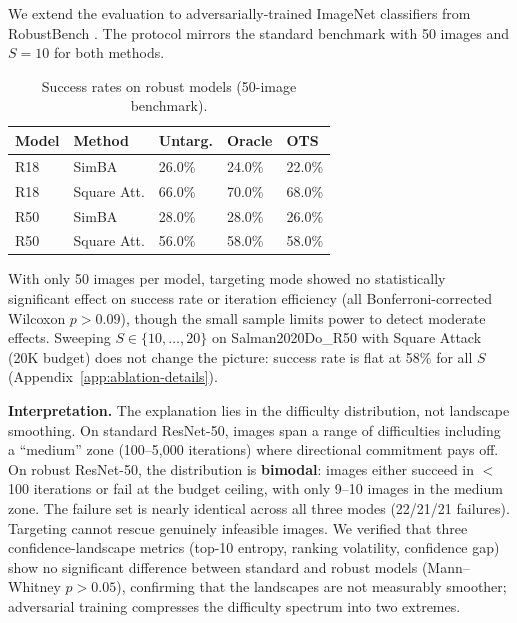 \documentclass{cap2026}
\begin{document}
We extend the evaluation to adversarially-trained ImageNet classifiers from RobustBench \citep{salman2020adversarially,croce2021robustbench}. The protocol mirrors the standard benchmark with 50 images and $S=10$ for both methods.

\begin{table}[t]
\centering
\caption{Success rates on robust models (50-image benchmark).}
\label{tab:robust-results}
\small
\begin{tabular}{@{}lllll@{}}
\toprule
Model & Method & Untarg. & Oracle & OTS \\
\midrule
R18 & SimBA & 26.0\% & 24.0\% & 22.0\% \\
R18 & Square Att. & 66.0\% & 70.0\% & 68.0\% \\
R50 & SimBA & 28.0\% & 28.0\% & 26.0\% \\
R50 & Square Att. & 56.0\% & 58.0\% & 58.0\% \\
\bottomrule
\end{tabular}
\end{table}

With only 50 images per model, targeting mode showed no statistically significant effect on success rate or iteration efficiency (all Bonferroni-corrected Wilcoxon $p > 0.09$), though the small sample limits power to detect moderate effects. Sweeping $S \in \{10, \ldots, 20\}$ on Salman2020Do\_R50 with Square Attack (20K budget) does not change the picture: success rate is flat at 58\% for all $S$ (Appendix~\ref{app:ablation-details}).

\textbf{Interpretation.} The explanation lies in the difficulty distribution, not landscape smoothing. On standard ResNet-50, images span a range of difficulties including a ``medium'' zone (100--5,000 iterations) where directional commitment pays off. On robust ResNet-50, the distribution is \textbf{bimodal}: images either succeed in $<$100 iterations or fail at the budget ceiling, with only 9--10 images in the medium zone. The failure set is nearly identical across all three modes (22/21/21 failures). Targeting cannot rescue genuinely infeasible images. We verified that three confidence-landscape metrics (top-10 entropy, ranking volatility, confidence gap) show no significant difference between standard and robust models (Mann--Whitney $p > 0.05$), confirming that the landscapes are not measurably smoother; adversarial training compresses the difficulty spectrum into two extremes.

\end{document}
